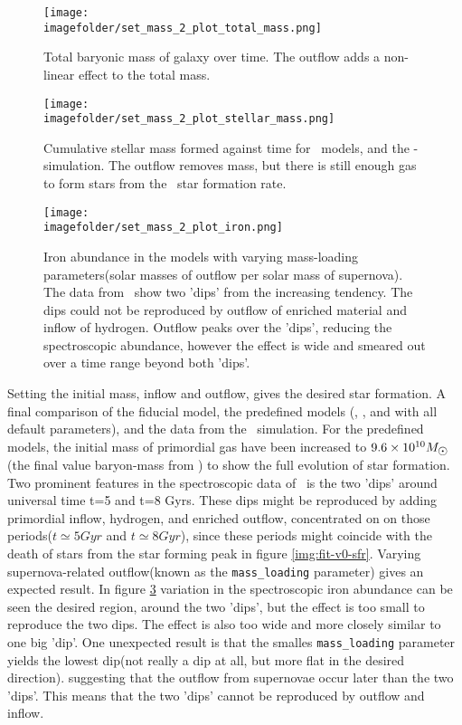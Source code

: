 \begin{figure}[h]
  \centering
  \texttt{[image: \\imagefolder/set\_mass\_2\_plot\_total\_mass.png]}
  \caption{\label{fig:fit-v1-2-total}
    Total baryonic mass of galaxy over time.
    The outflow adds a non-linear effect to the total mass.
  }
\end{figure}
\begin{figure}[h]
  \centering
  \texttt{[image: \\imagefolder/set\_mass\_2\_plot\_stellar\_mass.png]}
  \caption{\label{fig:fit-v1-2-stellar}
    Cumulative stellar mass formed against time for  \omegamodel\ models, and the \eris-simulation.
    The outflow removes mass, but there is still enough gas to form stars from the \eris\ star formation rate.
  }
\end{figure}
\begin{figure}[h]
  \centering
  \texttt{[image: \\imagefolder/set\_mass\_2\_plot\_iron.png]}
  \caption{\label{fig:fit-v1-2-iron}
    Iron abundance in the models with varying mass-loading parameters(solar masses of outflow per solar mass of supernova). The data from \eris\ show two 'dips' from the increasing tendency.
    The dips could not be reproduced by outflow of enriched material and inflow of hydrogen. Outflow peaks over the 'dips', reducing the spectroscopic abundance, however the effect is wide and smeared out over a time range beyond both 'dips'.
  }
\end{figure}

Setting the initial mass, inflow and outflow, gives the desired star formation. A final comparison of the fiducial \omegamodel model, the predefined models (\mwomega, \mwcomega, and \omegamodel with all default parameters), and the data from the \eris\ simulation.
For the predefined models, the initial mass of primordial gas have been increased to $9.6\times10^{10}\msol$(the final value baryon-mass from \eris) to show the full evolution of star formation.
Two prominent features in the spectroscopic data of \eris\ is the two 'dips' around universal time t=5 and t=8 Gyrs. These dips might be reproduced by adding primordial inflow, hydrogen, and enriched outflow, concentrated on on those periods($t\simeq5Gyr$ and $t\simeq8Gyr$), since these periods might coincide with the death of stars from the star forming peak in figure \ref{img:fit-v0-sfr}.
Varying supernova-related outflow(known as the \texttt{mass\_loading} parameter) gives an expected result. In figure \ref{fig:fit-v1-2-iron} variation in the spectroscopic iron abundance can be seen the desired region, around the two 'dips', but the effect is too small to reproduce the two dips. The effect is also too wide and more closely similar to one big 'dip'. One unexpected result is that the smalles \texttt{mass\_loading} parameter yields the lowest dip(not really a dip at all, but more flat in the desired direction). suggesting that the outflow from supernovae occur later than the two 'dips'.
This means that the two 'dips' cannot be reproduced by outflow and inflow.

